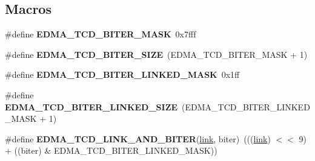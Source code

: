 \subsection*{Macros}
\begin{DoxyCompactItemize}
\item 
\mbox{\label{regs-edma_8h_aa1d66288b967bb36c1523ee2332cf592}} 
\#define {\bfseries E\+D\+M\+A\+\_\+\+T\+C\+D\+\_\+\+B\+I\+T\+E\+R\+\_\+\+M\+A\+SK}~0x7fff
\item 
\mbox{\label{regs-edma_8h_aa64a3a4fdacbb3e6961da403262b7f1b}} 
\#define {\bfseries E\+D\+M\+A\+\_\+\+T\+C\+D\+\_\+\+B\+I\+T\+E\+R\+\_\+\+S\+I\+ZE}~(E\+D\+M\+A\+\_\+\+T\+C\+D\+\_\+\+B\+I\+T\+E\+R\+\_\+\+M\+A\+SK + 1)
\item 
\mbox{\label{regs-edma_8h_ab0cae93ff33af47ed789c2b15d56c7d7}} 
\#define {\bfseries E\+D\+M\+A\+\_\+\+T\+C\+D\+\_\+\+B\+I\+T\+E\+R\+\_\+\+L\+I\+N\+K\+E\+D\+\_\+\+M\+A\+SK}~0x1ff
\item 
\mbox{\label{regs-edma_8h_a4f9d2c38a865d16d83ac2721d9c2b0bc}} 
\#define {\bfseries E\+D\+M\+A\+\_\+\+T\+C\+D\+\_\+\+B\+I\+T\+E\+R\+\_\+\+L\+I\+N\+K\+E\+D\+\_\+\+S\+I\+ZE}~(E\+D\+M\+A\+\_\+\+T\+C\+D\+\_\+\+B\+I\+T\+E\+R\+\_\+\+L\+I\+N\+K\+E\+D\+\_\+\+M\+A\+SK + 1)
\item 
\mbox{\label{regs-edma_8h_ad4340e74fc563de0ec0bf42f1d8c7b3c}} 
\#define {\bfseries E\+D\+M\+A\+\_\+\+T\+C\+D\+\_\+\+L\+I\+N\+K\+\_\+\+A\+N\+D\+\_\+\+B\+I\+T\+ER}(\mbox{\hyperlink{link_8c_a8c94afd0b7e5bb4ce95fefd964241f7f}{link}},  biter)~(((\mbox{\hyperlink{link_8c_a8c94afd0b7e5bb4ce95fefd964241f7f}{link}}) $<$$<$ 9) + ((biter) \& E\+D\+M\+A\+\_\+\+T\+C\+D\+\_\+\+B\+I\+T\+E\+R\+\_\+\+L\+I\+N\+K\+E\+D\+\_\+\+M\+A\+SK))
\end{DoxyCompactItemize}
